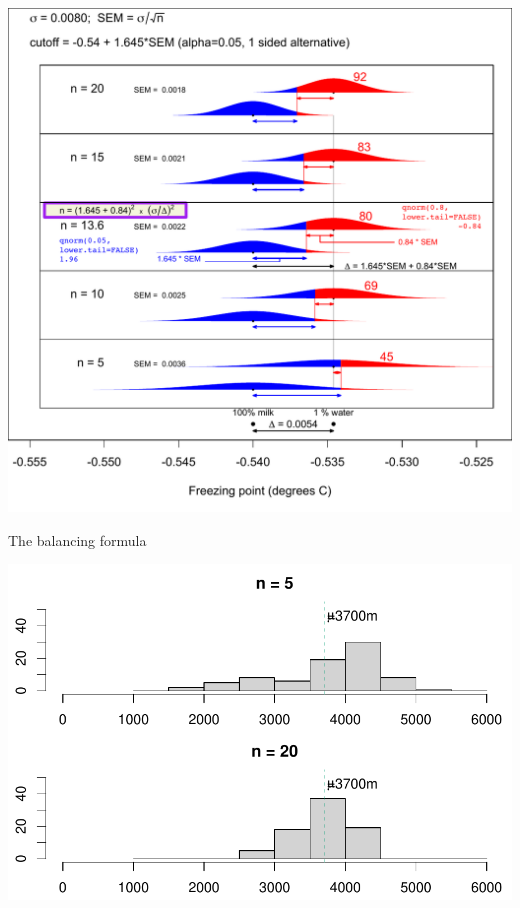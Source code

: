 \documentclass[10pt]{beamer}\usepackage[]{graphicx}\usepackage[]{color}
\makeatletter
\def\maxwidth{ %
  \ifdim\Gin@nat@width>\linewidth
    \linewidth
  \else
    \Gin@nat@width
  \fi
}
\newenvironment{knitrout}{}{} %
\makeatother
\begin{document}
\begin{frame}
	\begin{center}
		\includegraphics[scale=0.5]{SampleSize1pctWaterAdded.pdf} 
	\end{center}
\end{frame}

\begin{frame}[fragile]{The balancing formula}
\begin{knitrout}\tiny
{}\color{fgcolor}

{\centering \includegraphics[width=\maxwidth]{figure/unnamed-chunk-20-1} 

}



\end{knitrout}
\end{frame}
\end{document}
